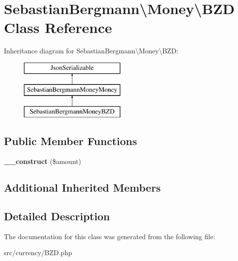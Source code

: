 \hypertarget{classSebastianBergmann_1_1Money_1_1BZD}{}\section{Sebastian\+Bergmann\textbackslash{}Money\textbackslash{}B\+Z\+D Class Reference}
\label{classSebastianBergmann_1_1Money_1_1BZD}
Inheritance diagram for Sebastian\+Bergmann\textbackslash{}Money\textbackslash{}B\+Z\+D\+:\begin{figure}[H]
\begin{center}
\leavevmode
\includegraphics[height=3.000000cm]{classSebastianBergmann_1_1Money_1_1BZD}
\end{center}
\end{figure}
\subsection*{Public Member Functions}
\begin{DoxyCompactItemize}
\item 
\hypertarget{classSebastianBergmann_1_1Money_1_1BZD_a32403cf15b4ef9329dde042383b7672e}{}{\bfseries \+\_\+\+\_\+construct} (\$amount)\label{classSebastianBergmann_1_1Money_1_1BZD_a32403cf15b4ef9329dde042383b7672e}

\end{DoxyCompactItemize}
\subsection*{Additional Inherited Members}


\subsection{Detailed Description}


The documentation for this class was generated from the following file\+:\begin{DoxyCompactItemize}
\item 
src/currency/B\+Z\+D.\+php\end{DoxyCompactItemize}
